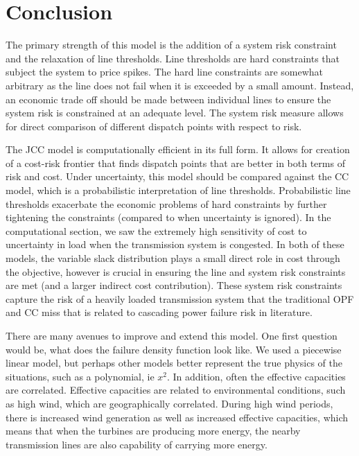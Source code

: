 \section{Conclusion}


The primary strength of this model is the addition of a system risk constraint and the relaxation of line thresholds. Line thresholds are hard constraints that subject the system to price spikes.  The hard line constraints are somewhat arbitrary as the line does not fail when it is exceeded by a small amount.  Instead, an economic trade off should be made between individual lines to ensure the system risk is constrained at an adequate level.  The system risk measure allows for direct comparison of different dispatch points with respect to risk.

The JCC model is computationally efficient in its full form.  It allows for creation of a cost-risk frontier that finds dispatch points that are better in both terms of risk and cost.  Under uncertainty, this model should be compared against the CC model, which is a probabilistic interpretation of line thresholds.  Probabilistic line thresholds exacerbate the economic problems of hard constraints by further tightening the constraints (compared to when uncertainty is ignored).  In the computational section, we saw the extremely high sensitivity of cost to uncertainty in load when the transmission system is congested.  In both of these models, the variable slack distribution plays a small direct role in cost through the objective, however is crucial in ensuring the line and system risk constraints are met (and a larger indirect cost contribution).  These system risk constraints capture the risk of a heavily loaded transmission system that the traditional OPF and CC miss that is related to cascading power failure risk in literature.
  


There are many avenues to improve and extend this model.  One first question would be, what does the failure density function look like.  We used a piecewise linear model, but perhaps other models better represent the true physics of the situations, such as a polynomial, ie $x^2$.  In addition, often the effective capacities are correlated.  Effective capacities are related to environmental conditions, such as high wind, which are geographically correlated.  During high wind periods, there is increased wind generation as well as increased effective capacities, which means that when the turbines are producing more energy, the nearby transmission lines are also capability of carrying more energy.  

